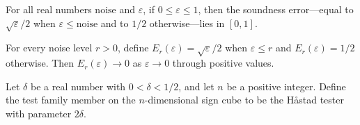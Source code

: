 \begin{theorem}
\label{FABL.hastadSoundnessError_mem_Icc}
\leanok
{}
For all real numbers $\mathrm{noise}$ and $\varepsilon$, if $0\leq\varepsilon\leq1$,
then the soundness error—equal to $\sqrt{\varepsilon}/2$ when
$\varepsilon\leq\mathrm{noise}$ and to $1/2$ otherwise—lies in $[0,1]$.
\end{theorem}

\begin{theorem}
\label{FABL.hastadSoundnessError_tendsto_zero}
\leanok
{}
For every noise level $r>0$, define $E_r(\varepsilon)=\sqrt{\varepsilon}/2$ when
$\varepsilon\le r$ and $E_r(\varepsilon)=1/2$ otherwise. Then $E_r(\varepsilon)\to 0$ as
$\varepsilon\to0$ through positive values.
\end{theorem}

\begin{definition}
\label{FABL.hastadDictatorTestFamily}
\leanok
{}
Let $\delta$ be a real number with $0<\delta<1/2$, and let $n$ be a positive integer.
Define the test family member on the $n$-dimensional sign cube to be the Håstad tester
with parameter $2\delta$.
\end{definition}

